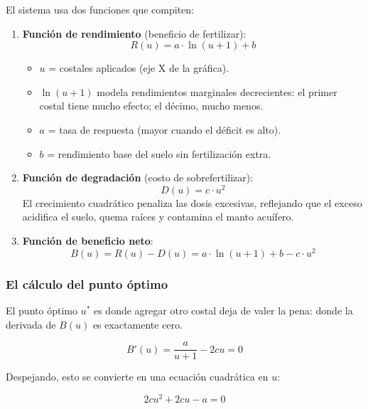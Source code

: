 \documentclass[12pt]{article}
\begin{document}
El sistema usa dos funciones que compiten:

\begin{enumerate}
    \item \textbf{Función de rendimiento} (beneficio de fertilizar):
    $$R(u) = a \cdot \ln(u + 1) + b$$
    \begin{itemize}
        \item $u$ = costales aplicados (eje X de la gráfica).
        \item $\ln(u+1)$ modela rendimientos marginales decrecientes: el primer costal tiene mucho efecto; el décimo, mucho menos.
        \item $a$ = tasa de respuesta (mayor cuando el déficit es alto).
        \item $b$ = rendimiento base del suelo sin fertilización extra.
    \end{itemize}

    \item \textbf{Función de degradación} (costo de sobrefertilizar):
    $$D(u) = c \cdot u^2$$
    El crecimiento cuadrático penaliza las dosis excesivas, reflejando que el exceso acidifica el suelo, quema raíces y contamina el manto acuífero.

    \item \textbf{Función de beneficio neto}:
    $$B(u) = R(u) - D(u) = a \cdot \ln(u + 1) + b - c \cdot u^2$$
\end{enumerate}

\subsubsection{El cálculo del punto óptimo}
El punto óptimo $u^*$ es donde agregar otro costal deja de valer la pena: donde la derivada de $B(u)$ es exactamente cero.

$$B'(u) = \frac{a}{u+1} - 2cu = 0$$

Despejando, esto se convierte en una ecuación cuadrática en $u$:

$$2cu^2 + 2cu - a = 0$$
\end{document}
